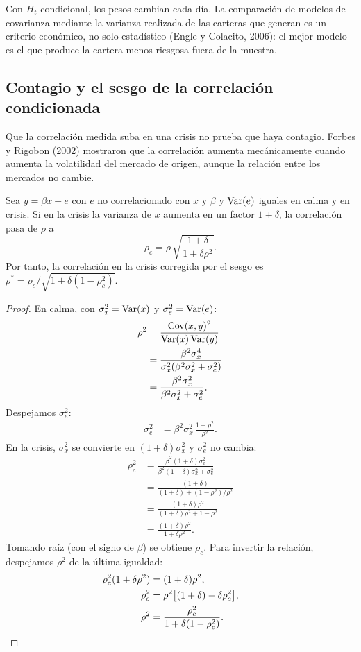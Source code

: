 Con $H_t$ condicional, los pesos cambian cada día. La comparación de modelos de covarianza mediante la varianza
realizada de las carteras que generan es un criterio económico, no solo estadístico (Engle y Colacito, 2006): el
mejor modelo es el que produce la cartera menos riesgosa fuera de la muestra.

\subsection{Contagio y el sesgo de la correlación condicionada}

Que la correlación medida suba en una crisis no prueba que haya contagio. Forbes y Rigobon (2002) mostraron que
la correlación aumenta mecánicamente cuando aumenta la volatilidad del mercado de origen, aunque la relación
entre los mercados no cambie.

\begin{proposicion}\label{prop:forbes}
Sea $y=\beta x+e$ con $e$ no correlacionado con $x$ y $\beta$ y $\operatorname{Var}(e)$ iguales en calma y en crisis. Si en la
crisis la varianza de $x$ aumenta en un factor $1+\delta$, la correlación pasa de $\rho$ a
\[
  \rho_c=\rho\,\sqrt{\frac{1+\delta}{1+\delta\rho^2}} .
\]
Por tanto, la correlación en la crisis corregida por el sesgo es $\rho^*=\rho_c\big/\sqrt{1+\delta(1-\rho_c^2)}$.
\end{proposicion}

\begin{proof}
En calma, con $\sigma_x^2=\operatorname{Var}(x)$ y $\sigma_e^2=\operatorname{Var}(e)$:
\begin{align*}
  \rho^2 &= \frac{\operatorname{Cov}(x,y)^2}{\operatorname{Var}(x)\operatorname{Var}(y)}\\
         &= \frac{\beta^2\sigma_x^4}{\sigma_x^2(\beta^2\sigma_x^2+\sigma_e^2)}\\
         &= \frac{\beta^2\sigma_x^2}{\beta^2\sigma_x^2+\sigma_e^2}.
\end{align*}
Despejamos $\sigma_e^2$:
\begin{align*}
  \sigma_e^2 &= \beta^2\sigma_x^2\,\frac{1-\rho^2}{\rho^2}.
\end{align*}
En la crisis, $\sigma_x^2$ se convierte en $(1+\delta)\sigma_x^2$ y $\sigma_e^2$ no cambia:
\begin{align*}
  \rho_c^2 &= \frac{\beta^2(1+\delta)\sigma_x^2}{\beta^2(1+\delta)\sigma_x^2+\sigma_e^2}\\
           &= \frac{(1+\delta)}{(1+\delta)+(1-\rho^2)/\rho^2}\\
           &= \frac{(1+\delta)\rho^2}{(1+\delta)\rho^2+1-\rho^2}\\
           &= \frac{(1+\delta)\rho^2}{1+\delta\rho^2}.
\end{align*}
Tomando raíz (con el signo de $\beta$) se obtiene $\rho_c$. Para invertir la relación, despejamos $\rho^2$ de la
última igualdad:
\begin{align*}
  \rho_c^2(1+\delta\rho^2) &= (1+\delta)\rho^2,\\
  \rho_c^2 &= \rho^2\bigl[(1+\delta)-\delta\rho_c^2\bigr],\\
  \rho^2 &= \frac{\rho_c^2}{1+\delta(1-\rho_c^2)}. && \qedhere
\end{align*}
\end{proof}

